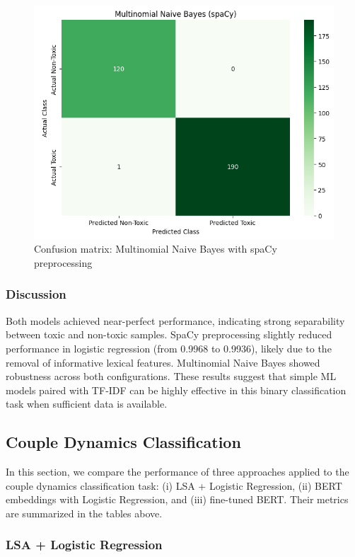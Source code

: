 \documentclass[conference]{IEEEtran}
\begin{document}
\begin{figure}[H]
  \centering
  \includegraphics[width=0.9\columnwidth]{figures/confusion_nb_spacy.png}
  \caption{Confusion matrix: Multinomial Naive Bayes with spaCy preprocessing}
\end{figure}

\subsubsection{Discussion}

Both models achieved near-perfect performance, indicating strong separability between toxic and non-toxic samples. SpaCy preprocessing slightly reduced performance in logistic regression (from 0.9968 to 0.9936), likely due to the removal of informative lexical features. Multinomial Naive Bayes showed robustness across both configurations. These results suggest that simple ML models paired with TF‑IDF can be highly effective in this binary classification task when sufficient data is available.

\subsection{Couple Dynamics Classification}

In this section, we compare the performance of three approaches applied to the couple dynamics classification task: (i) LSA + Logistic Regression, (ii) BERT embeddings with Logistic Regression, and (iii) fine-tuned BERT. Their metrics are summarized in the tables above.

\subsubsection{LSA + Logistic Regression}
\noindent
\end{document}
